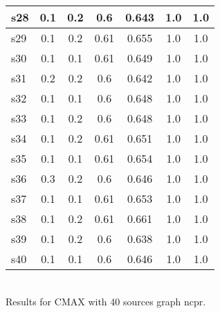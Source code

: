 \documentclass{article}
\begin{document}
\begin{tabular}{|l|c|c|c|c|c|c|}
\hline
s28 &0.1 & 0.2 & 0.6 & 0.643 & 1.0 & 1.0\\
\hline
s29 &0.1 & 0.2 & 0.61 & 0.655 & 1.0 & 1.0\\
\hline
s30 &0.1 & 0.1 & 0.61 & 0.649 & 1.0 & 1.0\\
\hline
s31 &0.2 & 0.2 & 0.6 & 0.642 & 1.0 & 1.0\\
\hline
s32 &0.1 & 0.1 & 0.6 & 0.648 & 1.0 & 1.0\\
\hline
s33 &0.1 & 0.2 & 0.6 & 0.648 & 1.0 & 1.0\\
\hline
s34 &0.1 & 0.2 & 0.61 & 0.651 & 1.0 & 1.0\\
\hline
s35 &0.1 & 0.1 & 0.61 & 0.654 & 1.0 & 1.0\\
\hline
s36 &0.3 & 0.2 & 0.6 & 0.646 & 1.0 & 1.0\\
\hline
s37 &0.1 & 0.1 & 0.61 & 0.653 & 1.0 & 1.0\\
\hline
s38 &0.1 & 0.2 & 0.61 & 0.661 & 1.0 & 1.0\\
\hline
s39 &0.1 & 0.2 & 0.6 & 0.638 & 1.0 & 1.0\\
\hline
s40 &0.1 & 0.1 & 0.6 & 0.646 & 1.0 & 1.0\\
\hline
\end{tabular}\\

\noindent Results for CMAX with 40 sources graph ncpr.
\end{document}
